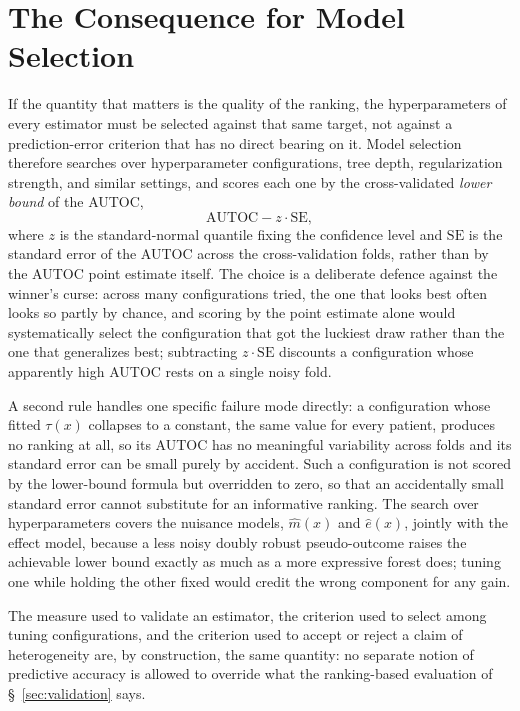 \section{The Consequence for Model Selection}

If the quantity that matters is the quality of the ranking, the
hyperparameters of every estimator must be selected against that same
target, not against a prediction-error criterion that has no direct
bearing on it. Model selection therefore searches over hyperparameter
configurations, tree depth, regularization strength, and similar settings,
and scores each one by the cross-validated \emph{lower bound} of the AUTOC,
\[
\text{AUTOC} - z \cdot \text{SE},
\]
where $z$ is the standard-normal quantile fixing the confidence level and
$\text{SE}$ is the standard error of the AUTOC across the cross-validation
folds, rather than by the AUTOC point estimate itself. The choice is a
deliberate defence against the winner's curse: across many configurations
tried, the one that looks best often looks so partly by chance, and scoring
by the point estimate alone would systematically select the configuration
that got the luckiest draw rather than the one that generalizes best;
subtracting $z \cdot \text{SE}$ discounts a configuration whose apparently
high AUTOC rests on a single noisy fold.

\vspace{10pt}

A second rule handles one specific failure mode directly: a configuration
whose fitted $\tau(x)$ collapses to a constant, the same value for every
patient, produces no ranking at all, so its AUTOC has no meaningful
variability across folds and its standard error can be small purely by
accident. Such a configuration is not scored by the lower-bound formula but
overridden to zero, so that an accidentally small standard error cannot
substitute for an informative ranking. The search over hyperparameters
covers the nuisance models, $\hat m(x)$ and $\hat e(x)$, jointly with the
effect model, because a less noisy doubly robust pseudo-outcome raises the
achievable lower bound exactly as much as a more expressive forest does;
tuning one while holding the other fixed would credit the wrong component
for any gain.

\vspace{10pt}

The measure used to validate an estimator, the criterion used to select
among tuning configurations, and the criterion used to accept or reject a
claim of heterogeneity are, by construction, the same quantity: no separate
notion of predictive accuracy is allowed to override what the ranking-based
evaluation of \S~\ref{sec:validation} says.

